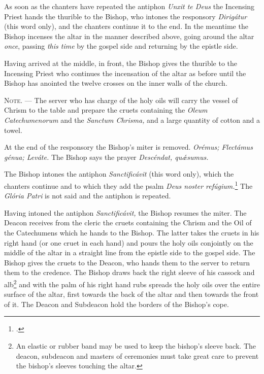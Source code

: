 \documentclass[letterpaper]{report}
\begin{document}
{    As soon as the chanters have repeated the antiphon \textit{Unxit te Deus}
    the Incensing Priest hands the thurible to the Bishop, who intones the
    responsory \textit{Dirig\'atur} (this word only), and the chanters continue
    it to the end. In the meantime the Bishop incenses the altar in the manner
    described above, going around the altar \textit{once}, passing \textit{this
    time} by the gospel side and returning by the epistle side.

    \rubric Having arrived at the middle, in front, the Bishop gives the
    thurible to the Incensing Priest who continues the incensation of the altar
    as before until the Bishop has anointed the twelve crosses on the inner
    walls of the church.

    \textsc{Note. ---} The server who has charge of the holy oils will carry
    the vessel of Chrism to the table and prepare the cruets containing the
    \textit{Oleum Catechumenorum} and the \textit{Sanctum Chrisma,} and a large
    quantity of cotton and a towel.

    \rubric At the end of the responsory the Bishop's miter is removed.
    \textit{Orémus; Flectámus génua; Leváte.} The Bishop says the prayer
    \textit{Descéndat, qu\'\ae sumus.}

    \rubric The Bishop intones the antiphon \textit{Sanctificávit} (this word
    only), which the chanters continue and to which they add the psalm
    \textit{Deus noster refúgium.}\footcite[The antiphon \textit{Sanctificávit
    Dóminus} may be repeated after each verse of this psalm.][footnote 1, p.
    108.]{consecranda} The \textit{Glória Patri} is not said and the antiphon
    is repeated.

    \rubric Having intoned the antiphon \textit{Sanctificávit,} the Bishop
    resumes the miter. The Deacon receives from the cleric the cruets
    containing the Chrism and the Oil of the Catechumens which he hands to the
    Bishop. The latter takes the cruets in his right hand (or one cruet in each
    hand) and pours the holy oils conjointly on the middle of the altar in a
    straight line from the epistle side to the gospel side. The Bishop gives
    the cruets to the Deacon, who hands them to the server to return them to
    the credence. The Bishop draws back the right sleeve of his cassock and
    alb\footnote{An elastic or rubber band may be used to keep the bishop's
    sleeve back. The deacon, subdeacon and masters of ceremonies must take
    great care to prevent the bishop's sleeves touching the altar.} and with
    the palm of his right hand rubs spreads the holy oils over the entire
    surface of the altar, first towards the back of the altar and then towards
    the front of it. The Deacon and Subdeacon hold the borders of the Bishop's
    cope.

}
\end{document}
